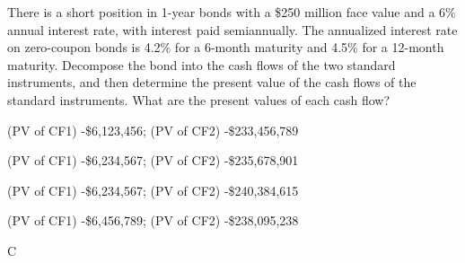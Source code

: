 \documentclass{article}
\newcounter{question} %
\begin{document}
\begin{question}
    There is a short position in 1-year bonds with a \$250 million face value and a 6\% annual interest rate, with interest paid semiannually. The annualized interest rate on zero-coupon bonds is 4.2\% for a 6-month maturity and 4.5\% for a 12-month maturity. Decompose the bond into the cash flows of the two standard instruments, and then determine the present value of the cash flows of the standard instruments. What are the present values of each cash flow?
\end{question}

\begin{choices}
    \item (PV of CF1) -\$6,123,456; (PV of CF2) -\$233,456,789
    \item (PV of CF1) -\$6,234,567; (PV of CF2) -\$235,678,901
    \item (PV of CF1) -\$6,234,567; (PV of CF2) -\$240,384,615
    \item (PV of CF1) -\$6,456,789; (PV of CF2) -\$238,095,238
\end{choices}

\begin{correctanswer}
    C
\end{correctanswer}
\end{document}
